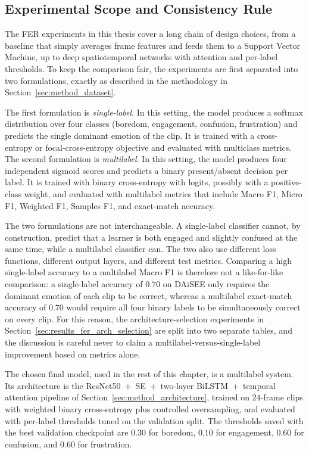 \subsection{Experimental Scope and Consistency Rule}\label{sec:results_fer_scope}

The FER experiments in this thesis cover a long chain of design choices, from a baseline that simply averages frame features and feeds them to a Support Vector Machine, up to deep spatiotemporal networks with attention and per-label thresholds. To keep the comparison fair, the experiments are first separated into two formulations, exactly as described in the methodology in Section~\ref{sec:method_dataset}.

The first formulation is \emph{single-label}. In this setting, the model produces a softmax distribution over four classes (boredom, engagement, confusion, frustration) and predicts the single dominant emotion of the clip. It is trained with a cross-entropy or focal-cross-entropy objective and evaluated with multiclass metrics. The second formulation is \emph{multilabel}. In this setting, the model produces four independent sigmoid scores and predicts a binary present/absent decision per label. It is trained with binary cross-entropy with logits, possibly with a positive-class weight, and evaluated with multilabel metrics that include Macro F1, Micro F1, Weighted F1, Samples F1, and exact-match accuracy.

The two formulations are not interchangeable. A single-label classifier cannot, by construction, predict that a learner is both engaged and slightly confused at the same time, while a multilabel classifier can. The two also use different loss functions, different output layers, and different test metrics. Comparing a high single-label accuracy to a multilabel Macro F1 is therefore not a like-for-like comparison: a single-label accuracy of $0.70$ on DAiSEE only requires the dominant emotion of each clip to be correct, whereas a multilabel exact-match accuracy of $0.70$ would require all four binary labels to be simultaneously correct on every clip. For this reason, the architecture-selection experiments in Section~\ref{sec:results_fer_arch_selection} are split into two separate tables, and the discussion is careful never to claim a multilabel-versus-single-label improvement based on metrics alone.

The chosen final model, used in the rest of this chapter, is a multilabel system. Its architecture is the ResNet50~+~SE~+~two-layer BiLSTM~+~temporal attention pipeline of Section~\ref{sec:method_architecture}, trained on $24$-frame clips with weighted binary cross-entropy plus controlled oversampling, and evaluated with per-label thresholds tuned on the validation split. The thresholds saved with the best validation checkpoint are $0.30$ for boredom, $0.10$ for engagement, $0.60$ for confusion, and $0.60$ for frustration.

